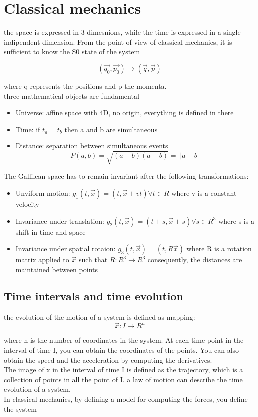 \section{Classical mechanics}

the space is expressed in 3 dimesnions, while the time is expressed in a single indipendent dimension. From the point of view of classical mechanics, it is sufficient to know the S0 state of the system

$$(\vec{q_0}, \vec{p_0}) \rightarrow (\vec{q}, \vec{p})$$

where q represents the positions and p the momenta.
\\
three mathematical objects are fundamental
\begin{itemize}
    \item Universe: affine space with 4D, no origin, everything is defined in there
    \item Time: if $t_a = t_b$ then a and b are simultaneous
    \item Distance: separation between simultaneous events 
    $$
        P(a, b) = \sqrt{(a-b) (a-b)} = ||a-b||
    $$
\end{itemize}

The Gallilean space has to remain invariant after the following transformations:
\begin{itemize}
    \item Unviform motion: $g_1(t, \vec{x}) = (t, \vec{x} + vt) \forall t \in R$
    where v is a constant velocity
    \item Invariance under translation: $g_2(t, \vec{x}) = (t + s, \vec{x} + s) \forall s \in R^3$
    where s is a shift in time and space
    \item Invariance under spatial rotaion: $g_3(t, \vec{x}) = (t, R\vec{x})$
    where R is a rotation matrix applied to $\vec{x}$ such that $R: R^3 \rightarrow R^3$
    consequently, the distances are maintained between points 
\end{itemize}

\subsection{Time intervals and time evolution}
the evolution of the motion of a system is defined as mapping:
$$
\vec{x} : I \rightarrow R^n
$$

where n is the number of coordinates in the system. At each time point in the interval of time I, you can obtain the coordinates of the points.
You can also obtain the speed and the acceleration by computing the derivatives.\\
The image of x in the interval of time I is defined as the trajectory, which is a collection of points in all the point of I.
a law of motion can describe the time evolution of a system.\\
In classical mechanics, by defining a model for computing the forces, you define the system

